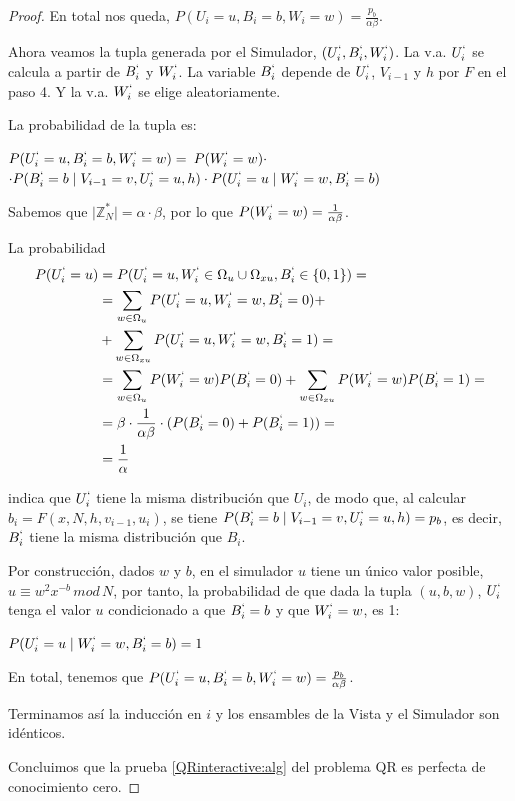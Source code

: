 \begin{proof}
	En total nos queda, $P(U_i=u, B_i=b, W_i=w) = \frac{p_b}{\alpha \beta}$.
	
	
	
	\hfil
	
	Ahora veamos la tupla generada por el Simulador, $(U_i^`, B_i^`, W_i^`)$. La v.a. $U_i^`$ se calcula a partir de $B_i^`$ y $W_i^`$. La variable $B_i^`$ depende de $U_i^`$, $V_{i-1}$ y $h$ por $F$ en el paso 4. Y la v.a. $W_i^`$ se elige aleatoriamente.
	
	La probabilidad de la tupla es:
	
	\begin{flushleft}
		$P(U_i^`=u, B_i^`=b, W_i^`=w) = $ 	$P(W_i^`=w)\cdot$ \\ 
		$ \cdot P(B_i^`=b \mid V_{i-1}=v, U_i^`=u,h) \cdot P(U_i^`=u \mid W_i^`=w, B_i^`=b)$
	\end{flushleft}
	
	Sabemos que $\mid \mathbb{Z}^*_N \mid = \alpha \cdot \beta $, por lo que $P(W_i^`=w) = \frac{1}{\alpha \beta}$.
	
	La probabilidad
	\begin{align*}
	P(U_i^`=u)  & = P(U_i^`=u, W_i^`\in \Omega_u \cup \Omega_{xu}, B_i^` \in \{0,1\}) = \\
				&= \sum_{w\in \Omega_u} P(U_i^`=u, W_i^`=w, B_i^` = 0) + \\
				& +	\sum_{w\in \Omega_{xu}} P(U_i^`=u, W_i^`=w, B_i^` = 1) = \\
				&= \sum_{w\in \Omega_u} P(W_i^`=w)P(B_i^` = 0) + \sum_{w\in \Omega_{xu}} P(W_i^`=w)P(B_i^` = 1) = \\
				&=\beta \cdot \frac{1}{\alpha \beta} \cdot (P(B_i^`=0) + P(B_i^`=1)) = \\
				&= \frac{1}{\alpha}
	\end{align*}
	
	indica que $U_i^`$ tiene la misma distribución que $U_i$, de modo que, al calcular $b_{i} = F(x,N,h,v_{i-1},u_{i})$, se tiene 
	$P(B_i^`=b \mid V_{i-1}=v, U_i^`=u,h) = p_b$, es decir, $B_i^`$ tiene la misma distribución que $B_i$.
	
	
	Por construcción, dados $w$ y $b$, en el simulador $u$ tiene un único valor posible, $u\equiv w^2x^{-b}\,mod\,N$, por tanto, la probabilidad de que dada la tupla $(u, b, w)$, $U_i^`$ tenga el valor $u$ condicionado a que $ B_i^`=b$ y que $W_i^`=w$, es 1:
	
	$P(U_i^`=u \mid W_i^`=w, B_i^`=b) = 1$
	
	
	\hfil
	
	En total, tenemos que $P(U_i^`=u, B_i^`=b, W_i^`=w) = \frac{p_b}{\alpha \beta}$.
	
	\hfil
	
	Terminamos así la inducción en $i$ y los ensambles de la Vista y el Simulador son idénticos.
	
	\hfil
	
	Concluimos que la prueba \ref{QRinteractive:alg} del problema QR es perfecta de conocimiento cero.
	
\end{proof}

